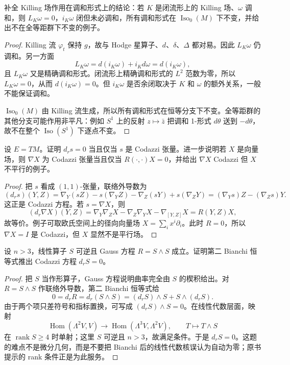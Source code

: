 \documentclass[11pt,a4paper,openany]{ctexbook}
\numberwithin{equation}{chapter}
\begin{document}
\begin{exercise}
补全 Killing 场作用在调和形式上的结论：若 \(K\) 是闭流形上的 Killing 场、\(\omega\) 调和，则 \(L_K\omega=0\)，\(i_K\omega\) 闭但未必调和，所有调和形式在 \(\operatorname{Iso}_0(M)\) 下不变，并给出不在全等距群下不变的例子。
\end{exercise}
\begin{proof}
Killing 流 \(\varphi_t\) 保持 \(g\)，故与 Hodge 星算子、\(d\)、\(\delta\)、\(\Delta\) 都对易。因此 \(L_K\omega\) 仍调和。另一方面
\[
L_K\omega=d(i_K\omega)+i_Kd\omega=d(i_K\omega),
\]
且 \(L_K\omega\) 又是精确调和形式。闭流形上精确调和形式的 \(L^2\) 范数为零，所以 \(L_K\omega=0\)，从而 \(d(i_K\omega)=0\)。但 \(i_K\omega\) 是否余闭取决于 \(K\) 和 \(\omega\) 的额外关系，一般不能保证调和。

\(\operatorname{Iso}_0(M)\) 由 Killing 流生成，所以所有调和形式在恒等分支下不变。全等距群的其他分支可能作用非平凡：例如 \(S^1\) 上的反射 \(z\mapsto \bar z\) 把调和 1-形式 \(d\theta\) 送到 \(-d\theta\)，故不在整个 \(\operatorname{Iso}(S^1)\) 下逐点不变。
\end{proof}

\begin{exercise}
设 \(E=TM\)。证明 \(d_r s=0\) 当且仅当 \(s\) 是 Codazzi 张量。进一步说明若 \(X\) 是向量场，则 \(\nabla X\) 为 Codazzi 张量当且仅当 \(R(\cdot,\cdot)X=0\)，并给出 \(\nabla X\) Codazzi 但 \(X\) 不平行的例子。
\end{exercise}
\begin{proof}
把 \(s\) 看成 \((1,1)\)-张量，联络外导数为
\[
(d_rs)(Y,Z)=\nabla_Y(sZ)-s(\nabla_YZ)-\nabla_Z(sY)+s(\nabla_ZY)
=(\nabla_Ys)Z-(\nabla_Zs)Y.
\]
这正是 Codazzi 方程。若 \(s=\nabla X\)，则
\[
(d_r\nabla X)(Y,Z)=\nabla_Y\nabla_ZX-\nabla_Z\nabla_YX-\nabla_{[Y,Z]}X=R(Y,Z)X,
\]
故等价。例子可取欧氏空间上的径向向量场 \(X=\sum_i x^i\partial_i\)。此时 \(R=0\)，所以 \(\nabla X=I\) 是 Codazzi，但 \(X\) 显然不是平行场。
\end{proof}

\begin{exercise}
设 \(n>3\)，线性算子 \(S\) 可逆且 Gauss 方程 \(R=S\wedge S\) 成立。证明第二 Bianchi 恒等式推出 Codazzi 方程 \(d_rS=0\)。
\end{exercise}
\begin{proof}
把 \(S\) 当作形算子，Gauss 方程说明曲率完全由 \(S\) 的楔积给出。对 \(R=S\wedge S\) 作联络外导数，第二 Bianchi 恒等式给
\[
0=d_rR=d_r(S\wedge S)= (d_rS)\wedge S+S\wedge(d_rS).
\]
由于两个项只差符号和指标置换，可写成 \((d_rS)\wedge S=0\)。在线性代数层面，映射
\[
\operatorname{Hom}(\Lambda^2V,V)\longrightarrow \operatorname{Hom}(\Lambda^3V,\Lambda^2V),
\qquad T\mapsto T\wedge S
\]
在 \(\operatorname{rank}S\ge4\) 时单射；这里 \(S\) 可逆且 \(n>3\)，故满足条件。于是 \(d_rS=0\)。这题的难点不是微分几何，而是不要把 Bianchi 后的线性代数核误认为自动为零；原书提示的 rank 条件正是为此服务。
\end{proof}
\end{document}
